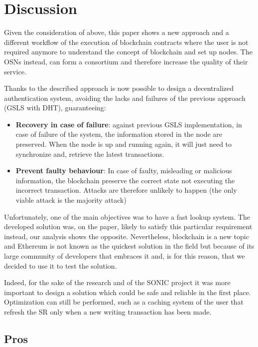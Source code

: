 \section{Discussion}
\label{S:6}

Given the consideration of above, this paper shows a new approach and a different workflow of the execution of blockchain contracts where the user is not required anymore to understand the concept of blockchain and set up nodes.
The OSNs instead, can form a consortium and therefore increase the quality of their service.

Thanks to the described approach is now possible to design a decentralized authentication system, avoiding the lacks and failures of the previous approach (GSLS with DHT), guaranteeing:

\begin{itemize}
    \item \textbf{Recovery in case of failure}: against previous GSLS implementation, in case of failure of the system, the information stored in the node are preserved. When the node is up and running again, it will just need to synchronize and, retrieve the latest transactions.
    \item \textbf{Prevent faulty behaviour}: In case of faulty, misleading or malicious information, the blockchain preserve the correct state not executing the incorrect transaction. Attacks are therefore unlikely to happen (the only viable attack is the majority attack)
\end{itemize}

Unfortunately, one of the main objectives was to have a fast lookup system.
The developed solution was, on the paper, likely to satisfy this particular requirement instead, our analysis shows the opposite. 
Nevertheless, blockchain is a new topic and Ethereum is not known as the quickest solution in the field but because of its large community of developers that embraces it and, is for this reason, that we decided to use it to test the solution.

Indeed, for the sake of the research and of the SONIC project it was more important to design a solution which could be safe and reliable in the first place. Optimization can still be performed, such as a caching system of the user that refresh the SR only when a new writing transaction has been made.


\subsection{Pros}

